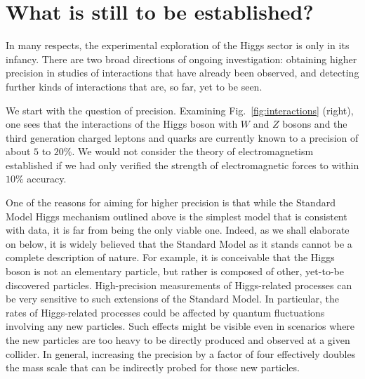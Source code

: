 \documentclass{article}
\begin{document}
\section*{What is still to be established?}

In many respects, the experimental exploration of the Higgs sector is
only in its infancy.
%
There are two broad directions of ongoing investigation: obtaining
higher precision in studies of interactions that have already been
observed, and detecting further kinds of interactions that are, so
far, yet to be seen.
% 

We start with the question of precision.
%
Examining Fig.~\ref{fig:interactions} (right), one sees that the
interactions of the Higgs boson with $W$ and $Z$ bosons and the third
generation charged leptons and quarks are currently known to a
precision of about $5$ to $20\%$.
%
We would not consider the theory of electromagnetism established if we had only
verified the strength of electromagnetic forces to within $10\%$
accuracy.

One of the reasons for aiming for higher precision is that while the
Standard Model Higgs mechanism outlined above is the simplest model
that is consistent with data, it is far from being the only viable
one.
%
Indeed, as we shall elaborate on below, it is widely believed that the
Standard Model as it stands cannot be a complete description of nature.
%
For example, it is conceivable that the Higgs boson is not an
elementary particle, but rather is composed of other, yet-to-be
discovered particles.
%
High-precision measurements of Higgs-related processes can be very
sensitive to such extensions of the Standard Model.
%
In particular, the rates of Higgs-related processes could be affected
by quantum fluctuations involving any new particles. Such effects
might be visible even in scenarios where the new particles are too
heavy to be directly produced and observed at a given collider.
%
In general, increasing the precision by a factor of four effectively
doubles the mass scale that can be indirectly probed for those new
particles.
%
\end{document}
